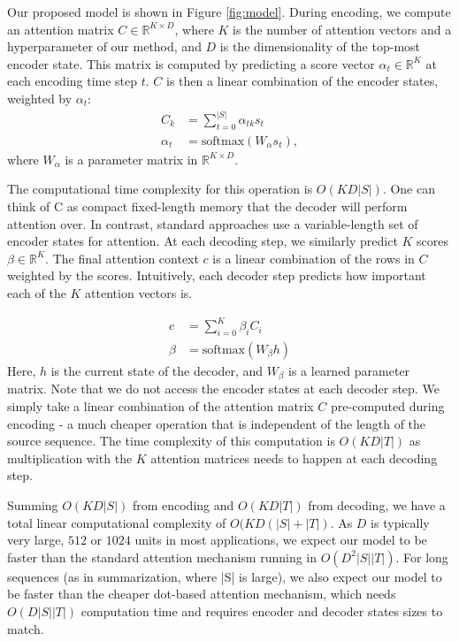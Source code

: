 \documentclass[11pt,letterpaper]{article}
\begin{document}
Our proposed model is shown in Figure \ref{fig:model}. During encoding, we compute an attention matrix $C \in \mathbb{R}^{K \times D}$, where $K$ is the number of attention vectors and a hyperparameter of our method, and $D$ is the dimensionality of the top-most encoder state. This matrix is computed by predicting a score vector $\alpha_t \in \mathbb{R}^K$ at each encoding time step $t$. $C$ is then a linear combination of the encoder states, weighted by $\alpha_t$:
\begin{align}
    C_k & = \sum_{t=0}^{|S|}{\alpha_{tk} s_t} \\
    \alpha_t & = \text{softmax}(W_\alpha s_t) ,
\end{align}
where $W_{\alpha}$ is a parameter matrix in $\mathbb{R}^{K\times D}$. 

The computational time complexity for this operation is $O(KD|S|)$. One can think of C as compact fixed-length memory that the decoder will perform attention over. In contrast, standard approaches use a variable-length set of encoder states for attention. At each decoding step, we similarly predict $K$ scores $\beta \in \mathbb{R}^K$. The final attention context $c$ is a linear combination of the rows in $C$ weighted by the scores.  Intuitively, each decoder step predicts how important each of the $K$ attention vectors is. 


\begin{align}
    c & = \sum_{i=0}^{K}{\beta_i C_i} \\
    \beta & = \text{softmax}(W_\beta h)
\end{align}
Here, $h$ is the current state of the decoder, and $W_\beta$ is a learned parameter matrix. Note that we do not access the encoder states at each decoder step. We simply take a linear combination of the attention matrix $C$ pre-computed during encoding - a much cheaper operation that is independent of the length of the source sequence. The time complexity of this computation is $O(KD|T|)$ as multiplication with the $K$ attention matrices needs to happen at each decoding step. 

Summing $O(KD|S|)$ from encoding and $O(KD|T|)$ from decoding, we have a total linear computational complexity of $O(KD(|S| + |T|)$. As $D$ is typically very large, $512$ or $1024$ units in most applications, we expect our model to be faster than the standard attention mechanism running in $O(D^2|S||T|)$. For long sequences (as in summarization, where |S| is large), we also expect our model to be faster than the cheaper dot-based attention mechanism, which needs $O(D|S||T|)$ computation time and requires encoder and decoder states sizes to match.
\end{document}
